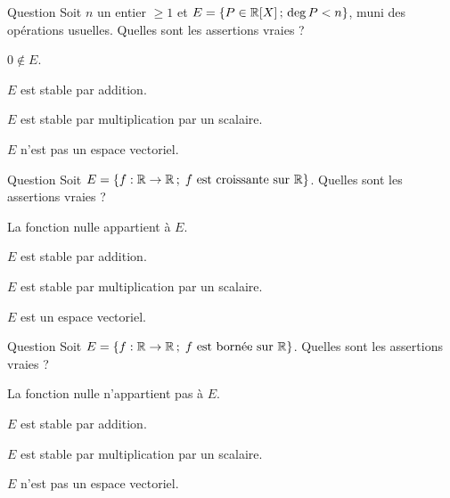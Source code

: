\begin{multi}[multiple,feedback=
{On a : \(0\in E\) et on vérifie que \(E\) est stable par addition et multiplication par un scalaire. Donc \(E\) est un sous-espace vectoriel de \(\Rr[X]\).
}]{Question}
Soit \(n\) un entier \(\ge 1\) et  \(E=\{P \in \mathbb{R}[X] \, ; \, \deg P< n\}\), muni des opérations usuelles. Quelles sont les assertions vraies ?

    \item \(0\notin E\).
    \item* \(E\) est stable par addition.
    \item* \(E\) est stable par multiplication par un scalaire.
    \item \(E\) n'est pas un espace vectoriel.
\end{multi}


\begin{multi}[multiple,feedback=
{La fonction nulle appartient à \(E\), puisqu'elle est constante.\\
On vérifie que \(E\) est stable par addition. Par contre, \(E\) ne l'est pas par multiplication par un scalaire \(<0\). Donc 
\(E\) n'est pas un espace vectoriel.
}]{Question}
Soit \(E=\{f:\mathbb{R} \to \mathbb{R} \, ; \; f\mbox{ est croissante sur }\mathbb{R}\}\). 
Quelles sont les assertions vraies ?

    \item* La fonction nulle appartient à \(E\).
    \item* \(E\) est stable par addition.
    \item \(E\) est stable par multiplication par un scalaire.
    \item \(E\) est un espace vectoriel.
\end{multi}


\begin{multi}[multiple,feedback=
{La fonction nulle appartient à \(E\), et \(E\) est stable par addition et par multiplication par un scalaire. Donc \(E\) est un espace vectoriel.
}]{Question}
Soit \(E =\{f :\mathbb{R} \to \mathbb{R} \, ; \; f\mbox{ est bornée sur }\mathbb{R}\}\). 
Quelles sont les assertions vraies ?

    \item La fonction nulle n'appartient pas à \(E\).
    \item* \(E\) est stable par addition.
    \item* \(E\) est stable par multiplication par un scalaire.
    \item \(E\) n'est pas un espace vectoriel.
\end{multi}


